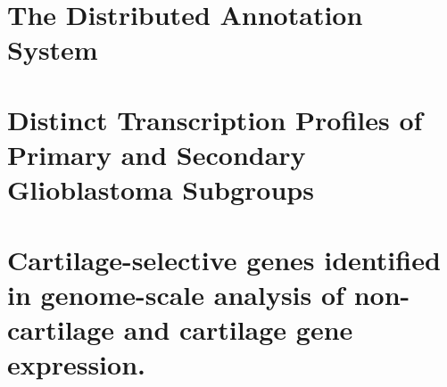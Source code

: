 \documentclass [PhD] {uclathes}
\begin{document}
\appendix
\chapter{The Distributed Annotation System}


\chapter{Distinct Transcription Profiles of Primary and Secondary Glioblastoma
Subgroups}

\chapter{Cartilage-selective genes identified in genome-scale analysis of
non-cartilage and cartilage gene expression.}



\end{document}
